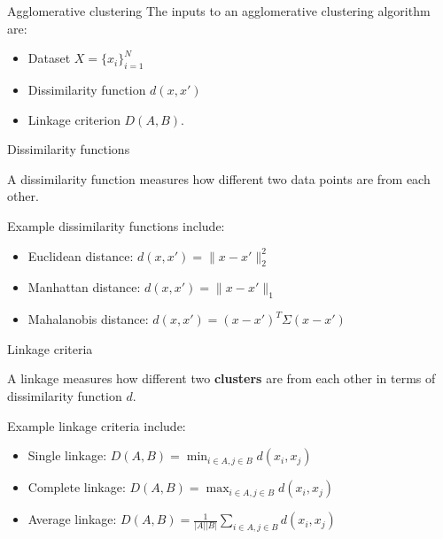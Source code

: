 \documentclass[10pt, compress]{beamer}
\begin{document}
\begin{frame}{Agglomerative clustering}
  The inputs to an agglomerative clustering algorithm
  are:
  \begin{itemize}
    \item<2-> Dataset $X = \{x_i\}_{i = 1}^N$
    \item<3-> Dissimilarity function $d(x, x')$
    \item<4-> Linkage criterion $D(A, B)$.
  \end{itemize}

\end{frame}

\begin{frame}{Dissimilarity functions}

  A dissimilarity function measures how
  different two data points are from each other.

  \pause

  Example dissimilarity functions include:
  \begin{itemize}
    \item Euclidean distance: $d(x, x') = \|x - x'\|_2^2$
    \item Manhattan distance: $d(x, x') = \|x - x'\|_1$
    \item Mahalanobis distance: $d(x, x') = (x - x')^T\Sigma(x - x')$
  \end{itemize}
\end{frame}

\begin{frame}{Linkage criteria}

  A linkage measures how
  different two \textbf{clusters} are from each other
  in terms of dissimilarity function $d$.

  \pause

  Example linkage criteria include:
  \begin{itemize}
    \item<2-> Single linkage: $D(A, B) = \min_{i \in A, j\in B} d(x_i, x_j)$
    \item<3-> Complete linkage: $D(A, B) = \max_{i \in A, j\in B} d(x_i, x_j)$
    \item<4-> Average linkage: $D(A, B) = \frac{1}{|A||B|}\sum_{i \in A, j\in B} d(x_i, x_j)$
  \end{itemize}
\end{frame}
\end{document}
